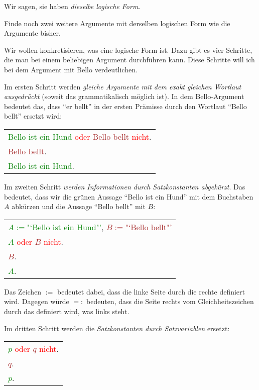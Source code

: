 \documentclass{zusammenfassung}
\begin{document}
Wir sagen, sie haben \emph{dieselbe logische Form}.

\begin{aufgabe}
  Finde noch zwei weitere Argumente mit derselben logischen Form wie die Argumente bisher.
\end{aufgabe}

Wir wollen konkretisieren, was eine logische Form ist. Dazu gibt es vier Schritte, die man bei einem beliebigen Argument
durchführen kann. Diese Schritte will ich bei dem Argument mit Bello verdeutlichen.

Im ersten Schritt werden \emph{gleiche Argumente mit dem exakt gleichen Wortlaut ausgedrückt} (soweit das grammatikalisch möglich
ist). In dem Bello-Argument bedeutet das, dass "`er bellt"' in der ersten Prämisse durch den Wortlaut "`Bello bellt"' ersetzt
wird:

\begin{tabular}{l}
  \textcolor{green}{Bello ist ein Hund} \textcolor{red}{oder} \textcolor{brown}{Bello bellt} \textcolor{red}{nicht}.\\
  \textcolor{brown}{Bello bellt}.\\
  \arrayrulecolor{red}\hline
  \textcolor{green}{Bello ist ein Hund}.
\end{tabular}

Im zweiten Schritt \emph{werden Informationen durch Satzkonstanten abgekürzt}. Das bedeutet, dass wir die grünen Aussage "`Bello
ist ein Hund"' mit dem Buchstaben $A$ abkürzen und die Aussage "`Bello bellt"' mit $B$:

\begin{tabular}{l}
  \textcolor{green}{$A:=\text{"`Bello ist ein Hund"'}$}, \textcolor{brown}{$B:=\text{"`Bello bellt"'}$}\\[1ex]
  \textcolor{green}{$A$} \textcolor{red}{oder} \textcolor{brown}{$B$} \textcolor{red}{nicht}.\\
  \textcolor{brown}{$B$}.\\
  \arrayrulecolor{red}\hline
  \textcolor{green}{$A$}.
\end{tabular}

Das Zeichen $:=$ bedeutet dabei, dass die linke Seite durch die rechte definiert wird. Dagegen würde $=:$ bedeuten, dass die Seite
rechts vom Gleichheitszeichen durch das definiert wird, was links steht.

Im dritten Schritt werden die \emph{Satzkonstanten durch Satzvariablen} ersetzt:

\begin{tabular}{l}
  \textcolor{green}{$p$} \textcolor{red}{oder} \textcolor{brown}{$q$} \textcolor{red}{nicht}.\\
  \textcolor{brown}{$q$}.\\
  \arrayrulecolor{red}\hline
  \textcolor{green}{$p$}.
\end{tabular}
\end{document}

